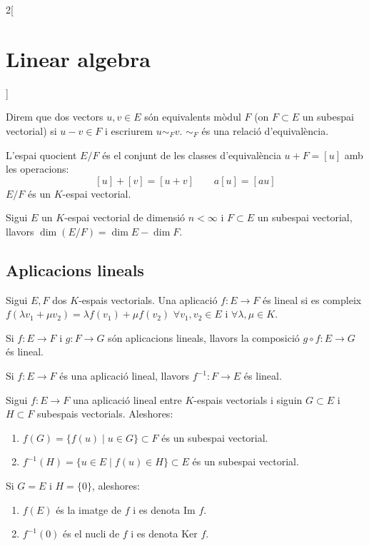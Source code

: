 \documentclass[../../../main.tex]{subfiles}
\begin{document}
\begin{multicols}{2}[\section{Linear algebra}]
\begin{definition}
\end{definition}
\begin{definition}
Direm que dos vectors $u,v\in E$ són equivalents mòdul $F$ (on $F\subset E$ un subespai vectorial) si $u-v\in F$ i escriurem $u\sim_Fv$. $\sim_F$ és una relació d'equivalència.
\end{definition}
\begin{definition}
L'espai quocient $E/F$ és el conjunt de les classes d'equivalència $u+F=[u]$ amb les operacions:
$$[u]+[v]=[u+v]\qquad a[u]=[au]$$ $E/F$ és un $K$-espai vectorial.
\end{definition}
\begin{prop}
Sigui $E$ un $K$-espai vectorial de dimensió $n<\infty$ i $F\subset E$ un subespai vectorial, llavors $\dim (E/F)=\dim E-\dim F$.
\end{prop}
\subsection{Aplicacions lineals}
\begin{definition}
Sigui $E,F$ dos $K$-espais vectorials. Una aplicació $f:E\rightarrow F$ és lineal si es compleix $f(\lambda v_1+\mu v_2)=\lambda f(v_1)+\mu f(v_2)$ $\forall v_1,v_2\in E$ i $\forall\lambda,\mu\in K$.
\end{definition}
\begin{prop}
Si $f:E\rightarrow F$ i $g:F\rightarrow G$ són aplicacions lineals, llavors la composició $g\circ f:E\rightarrow G$ és lineal.
\end{prop}
\begin{prop}
Si $f:E\rightarrow F$ és una aplicació lineal, llavors $f^{-1}:F\rightarrow E$ és lineal.
\end{prop}
\begin{prop}
Sigui $f:E\rightarrow F$ una aplicació lineal entre $K$-espais vectorials i siguin $G\subset E$ i $H\subset F$ subespais vectorials. Aleshores:
\begin{enumerate}
    \item $f(G)=\{f(u)\mid u\in G\}\subset F$ és un subespai vectorial.
    \item $f^{-1}(H)=\{u\in E\mid f(u)\in H\}\subset E$ és un subespai vectorial.
\end{enumerate}
Si $G=E$ i $H=\{0\}$, aleshores:
\begin{enumerate}
    \item $f(E)$ és la imatge de $f$ i es denota $\text{Im }f$.
    \item $f^{-1}(0)$ és el nucli de $f$ i es denota $\text{Ker }f$.

\end{enumerate}
\end{prop}
\end{multicols}
\end{document}
